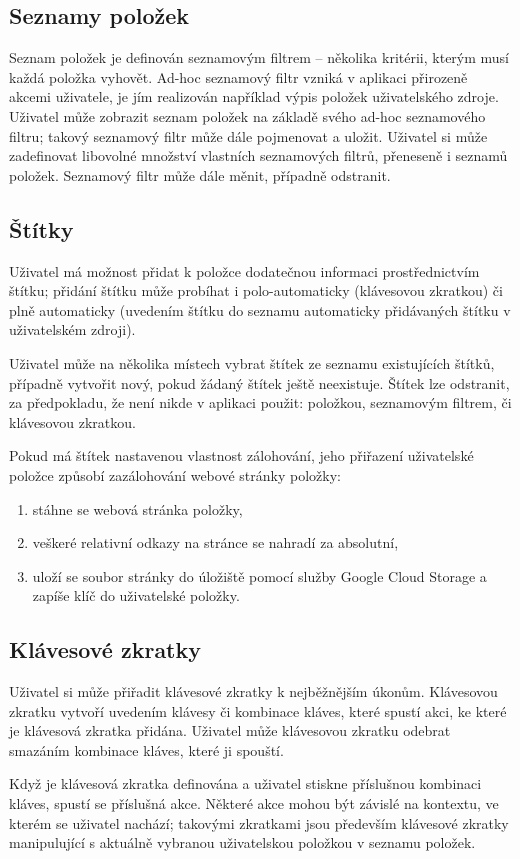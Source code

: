 \subsection{Seznamy položek}

Seznam položek je definován seznamovým filtrem -- několika kritérii, kterým musí každá položka vyhovět.
Ad-hoc seznamový filtr vzniká v aplikaci přirozeně akcemi uživatele, je jím realizován například výpis položek uživatelského zdroje.
Uživatel může zobrazit seznam položek na základě svého ad-hoc seznamového filtru; takový seznamový filtr může dále pojmenovat a uložit.
Uživatel si může zadefinovat libovolné množství vlastních seznamových filtrů, přeneseně i seznamů položek.
Seznamový filtr může dále měnit, případně odstranit.

\subsection{Štítky}\label{ssec:procesy-stitky}

Uživatel má možnost přidat k položce dodatečnou informaci prostřednictvím štítku; přidání štítku může probíhat i polo-automaticky (klávesovou zkratkou) či plně automaticky (uvedením štítku do seznamu automaticky přidávaných štítku v uživatelském zdroji).

Uživatel může na několika místech vybrat štítek ze seznamu existujících štítků, případně vytvořit nový, pokud žádaný štítek ještě neexistuje.
Štítek lze odstranit, za předpokladu, že není nikde v aplikaci použit: položkou, seznamovým filtrem, či klávesovou zkratkou.

Pokud má štítek nastavenou vlastnost zálohování, jeho přiřazení uživatelské položce způsobí zazálohování webové stránky položky:
\begin{enumerate}
	\item stáhne se webová stránka položky,
	\item veškeré relativní odkazy na stránce se nahradí za absolutní,
	\item uloží se soubor stránky do úložiště pomocí služby Google Cloud Storage a zapíše klíč do uživatelské položky.
\end{enumerate}

\subsection{Klávesové zkratky}

Uživatel si může přiřadit klávesové zkratky k nejběžnějším úkonům.
Klávesovou zkratku vytvoří uvedením klávesy či kombinace kláves, které spustí akci, ke které je klávesová zkratka přidána.
Uživatel může klávesovou zkratku odebrat smazáním kombinace kláves, které ji spouští.

Když je klávesová zkratka definována a uživatel stiskne příslušnou kombinaci kláves, spustí se příslušná akce.
Některé akce mohou být závislé na kontextu, ve kterém se uživatel nachází; takovými zkratkami jsou především klávesové zkratky manipulující s aktuálně vybranou uživatelskou položkou v seznamu položek.
